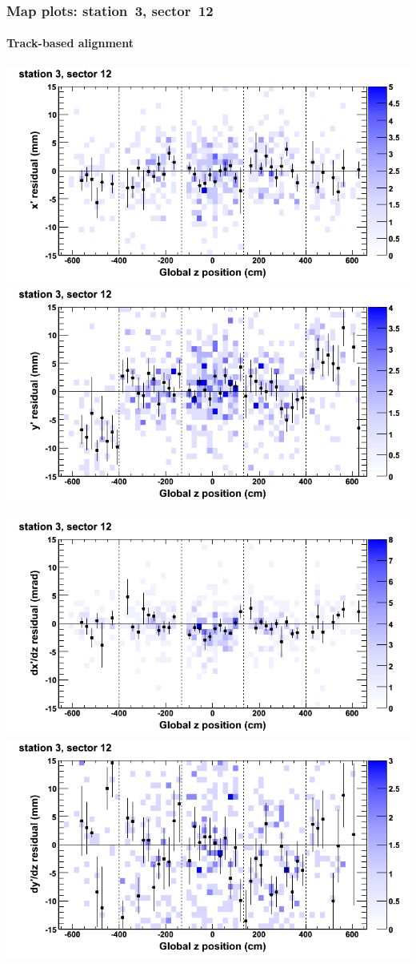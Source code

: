 \documentclass[compress]{beamer}
\begin{document}
\begin{frame}
\frametitle{Map plots: station~3, sector~12}
\framesubtitle{Track-based alignment}
\includegraphics[width=0.5\linewidth]{mapplots_re05/DTvsz_st3sec12_x.png}
\includegraphics[width=0.5\linewidth]{mapplots_re05/DTvsz_st3sec12_y.png}

\includegraphics[width=0.5\linewidth]{mapplots_re05/DTvsz_st3sec12_dxdz.png}
\includegraphics[width=0.5\linewidth]{mapplots_re05/DTvsz_st3sec12_dydz.png}
\end{frame}
\end{document}
